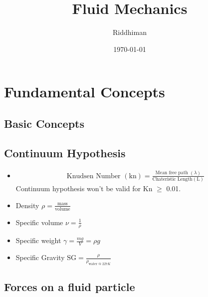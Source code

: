 \documentclass[12pt]{report}
\title{Fluid Mechanics}
\author{Riddhiman}
\date{\monthyeardate\today}
\theoremstyle{remark}
\begin{document}
\maketitle

\chapter{Fundamental Concepts}%
\label{cha:Fundamental Concepts}

\section{Basic Concepts}%
\label{sec:Basic Concepts}

\section{Continuum Hypothesis}%
\label{sec:Continuum Hypothesis}


\begin{itemize}
    \item \begin{align*}
    \text{Knudsen Number } (\text{kn}) = \frac{\text{Mean free path } (\lambda) }{\text{Chateristic Length} (\text{L})}
\end{align*}
    Continuum hypothesis won't be valid for Kn $ \geq $ 0.01. 
    \item Density $ \rho = \frac{\text{mass}}{\text{volume}} $
    \item Specific volume $ \nu = \frac{1}{\rho} $
    \item Specific weight $ \gamma = \frac{mg}{V} = \rho g $ 
    \item Specific Gravity $ \text{SG} = \frac{\rho}{\rho_{\text{water @ } 227K}} $
\end{itemize}

\section{Forces on a fluid particle}%
\label{sec:Forces on a fluid particle}
\end{document}

